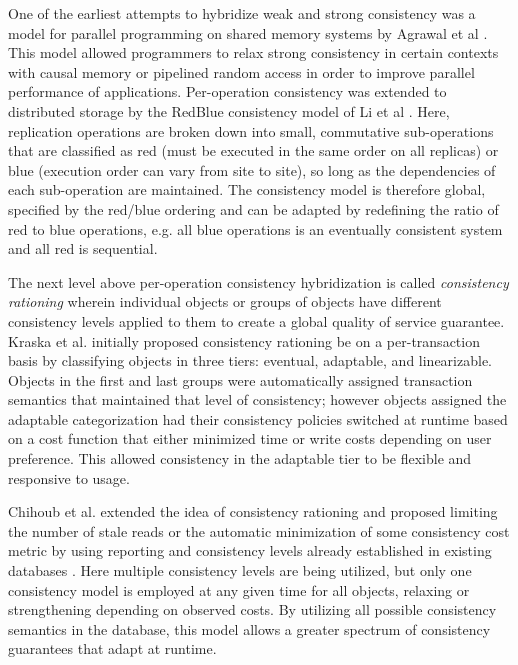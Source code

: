 \documentclass[10pt,conference,letterpaper]{IEEEtran}
\begin{document}
One of the earliest attempts to hybridize weak and strong consistency was a model for parallel programming on shared memory systems by Agrawal et al \cite{agrawal_mixed_1994}. This model allowed programmers to relax strong consistency in certain contexts with causal memory or pipelined random access in order to improve parallel performance of applications. Per-operation consistency was extended to distributed storage by the RedBlue consistency model of Li et al \cite{li_making_2012}. Here, replication operations are broken down into small, commutative sub-operations that are classified as red (must be executed in the same order on all replicas) or blue (execution order can vary from site to site), so long as the dependencies of each sub-operation are maintained. The consistency model is therefore global, specified by the red/blue ordering and can be adapted by redefining the ratio of red to blue operations, e.g. all blue operations is an eventually consistent system and all red is sequential.

The next level above per-operation consistency hybridization is called \textit{consistency rationing} wherein individual objects or groups of objects have different consistency levels applied to them to create a global quality of service guarantee. Kraska et al. \cite{kraska_consistency_2009} initially proposed consistency rationing be on a per-transaction basis by classifying objects in three tiers: eventual, adaptable, and linearizable. Objects in the first and last groups were automatically assigned transaction semantics that maintained that level of consistency; however objects assigned the adaptable categorization had their consistency policies switched at runtime based on a cost function that either minimized time or write costs depending on user preference. This allowed consistency in the adaptable tier to be flexible and responsive to usage.

Chihoub et al. extended the idea of consistency rationing and proposed limiting the number of stale reads or the automatic minimization of some consistency cost metric by using reporting and consistency levels already established in existing databases \cite{chihoub_harmony:_2012,chihoub_consistency_2013}. Here multiple consistency levels are being utilized, but only one consistency model is employed at any given time for all objects, relaxing or strengthening depending on observed costs. By utilizing all possible consistency semantics in the database, this model allows a greater spectrum of consistency guarantees that adapt at runtime.
\end{document}
